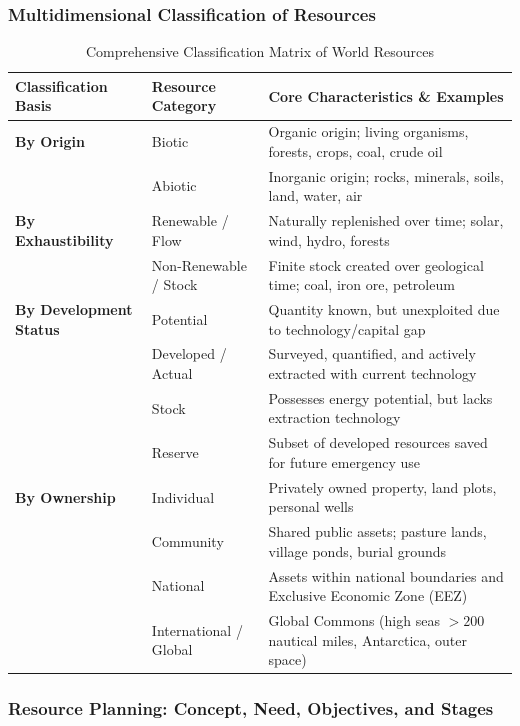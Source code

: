 \documentclass[11pt,a4paper]{article}
\begin{document}
\subsubsection{Multidimensional Classification of Resources}
\begin{table}[h!]
\centering
\small
\begin{tabularx}{\textwidth}{l X X}
\toprule
\textbf{Classification Basis} & \textbf{Resource Category} & \textbf{Core Characteristics \& Examples} \\
\midrule
\textbf{By Origin} & Biotic & Organic origin; living organisms, forests, crops, coal, crude oil \\
 & Abiotic & Inorganic origin; rocks, minerals, soils, land, water, air \\
\midrule
\textbf{By Exhaustibility} & Renewable / Flow & Naturally replenished over time; solar, wind, hydro, forests \\
 & Non-Renewable / Stock & Finite stock created over geological time; coal, iron ore, petroleum \\
\midrule
\textbf{By Development Status} & Potential & Quantity known, but unexploited due to technology/capital gap \\
 & Developed / Actual & Surveyed, quantified, and actively extracted with current technology \\
 & Stock & Possesses energy potential, but lacks extraction technology \\
 & Reserve & Subset of developed resources saved for future emergency use \\
\midrule
\textbf{By Ownership} & Individual & Privately owned property, land plots, personal wells \\
 & Community & Shared public assets; pasture lands, village ponds, burial grounds \\
 & National & Assets within national boundaries and Exclusive Economic Zone (EEZ) \\
 & International / Global & Global Commons (high seas $>200$ nautical miles, Antarctica, outer space) \\
\bottomrule
\end{tabularx}
\caption{Comprehensive Classification Matrix of World Resources}
\end{table}

\subsubsection{Resource Planning: Concept, Need, Objectives, and Stages}
\end{document}
